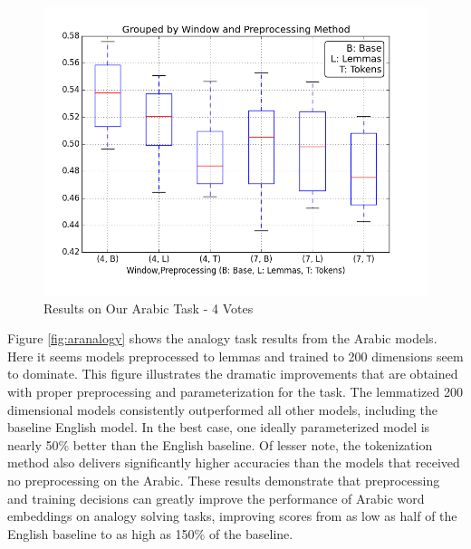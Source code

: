 \begin{figure}
  \includegraphics[width=\linewidth]{results_spearman/ar_similiarity_task_4_votes_results_spearplot.png}
  \caption{Results on Our Arabic Task - 4 Votes}
  \label{fig:spearplot4}
\end{figure}

Figure \ref{fig:aranalogy} shows the analogy task results from the Arabic models. Here it seems models preprocessed to lemmas and trained to 200 dimensions seem to dominate. This figure illustrates the dramatic improvements that are obtained with proper preprocessing and parameterization for the task. The lemmatized 200 dimensional models consistently outperformed all other models, including the baseline English model. In the best case, one ideally parameterized model is nearly 50\% better than the English baseline. Of lesser note, the tokenization method also delivers significantly higher accuracies than the models that received no preprocessing on the Arabic. These results demonstrate that preprocessing and training decisions can greatly improve the performance of Arabic word embeddings on analogy solving tasks, improving scores from as low as half of the English baseline to as high as 150\% of the baseline.

